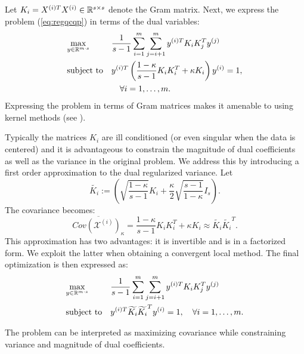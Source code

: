 Let $K_i = X^{(i)T} X^{(i)} \in \mathbb{R}^{s \times s}$ denote the Gram
matrix. Next, we express the problem (\ref{eq:regqcqp}) in terms of the dual variables:
 \begin{equation}\label{eq:dualregqcqp}
\begin{aligned}
& \underset{y \in \mathbb{R}^{m\cdot s}}{\text{max}}
& & \frac{1}{s -1} \sum_{i = 1}^m \sum_{j = i+1}^m y^{(i)T} K_i K_j^T y^{(j)} \\
& \text{subject to}
& & y^{(i)T} \left(\frac{1- \kappa}{s - 1}K_i K_i^T + \kappa  K_i\right) y^{(i)} = 1,\\
& &&\quad\forall i = 1,\ldots, m.
\end{aligned}
\end{equation}
Expressing the problem in terms of Gram matrices makes it amenable to using kernel methods (see \cite{shawe-taylor04kernel}).

Typically the matrices $K_i$ are ill conditioned (or even singular
when the data is centered) and it is advantageous to constrain the
magnitude of dual coefficients as well as the variance in the original
problem. We address this by introducing a first order approximation to
the dual regularized variance. Let 
$$\widetilde{K_i} := \left(\sqrt{\frac{1-\kappa}{s - 1}}K_i + \frac{\kappa}{2}
  \sqrt{\frac{s-1}{1- \kappa}}I_s\right).$$ 
The covariance becomes:
$$ \overline{Cov\left(\mathcal{X}^{(i)}\right)_{\kappa}} =  
 \frac{1- \kappa}{s - 1}K_i K_i^T + \kappa  K_i \approx  \widetilde{K_i} \widetilde{K_i}^T.$$
This approximation has two advantages: it is invertible and is in a
factorized form. We exploit the latter when obtaining a convergent local method.
The final optimization is then expressed as:
 \begin{equation}\label{eq:approxdualqcqp}
\begin{aligned}
& \underset{y \in \mathbb{R}^{m\cdot s}}{\text{max}}
& & \frac{1}{s - 1} \sum_{i = 1}^m \sum_{j = i+1}^m y^{(i)T} K_i K_j^T y^{(j)}\\
& \text{subject to}
& & y^{(i)T} \widetilde{K_i} \widetilde{K_i}^T y^{(i)} = 1, \quad\forall i = 1,\ldots, m.
\end{aligned}
\end{equation}

The problem can be interpreted as maximizing covariance while constraining variance 
and magnitude of dual coefficients. 

